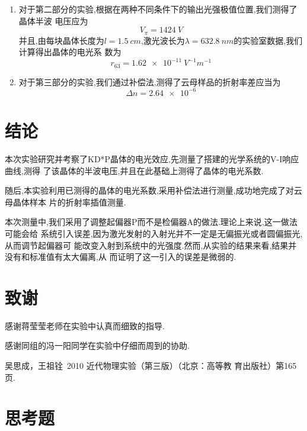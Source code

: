 \documentclass[aps,pre,12pt,preprint,onecolumn,showpacs,showkeys]{revtex4-1}
\begin{document}
\begin{enumerate}
\item
    对于第二部分的实验,根据在两种不同条件下的输出光强极值位置,我们测得了晶体半波
    电压应为
    \begin{equation}
        V_{\pi} = \SI{1424}{V}
    \end{equation}
    并且,由每块晶体长度为$l = \SI{1.5}{cm}$,激光波长为$\lambda = \SI{632.8}{nm}$的实验室数据,我们计算得出晶体的电光系
    数为
    \begin{equation}
        r_{63} = \SI{1.62e-11}{V^{-1}m^{-1}}
    \end{equation}

\item
    对于第三部分的实验,我们通过补偿法,测得了云母样品的折射率差应当为
    \begin{equation}
        \Delta n = \num{2.64e-6}
    \end{equation}

\end{enumerate}

\section{结论}

本次实验研究并考察了KD*P晶体的电光效应,先测量了搭建的光学系统的V-I响应曲线,测得
了该晶体的半波电压,并且在此基础上测得了晶体的电光系数.

随后,本实验利用已测得的晶体的电光系数,采用补偿法进行测量,成功地完成了对云母晶体样本
片的折射率插值测量.

本次测量中,我们采用了调整起偏器P而不是检偏器A的做法.理论上来说,这一做法可能会给
系统引入误差,因为激光发射的入射光并不一定是无偏振光或者圆偏振光,从而调节起偏器可
能改变入射到系统中的光强度.然而,从实验的结果来看,结果并没有和标准值有太大偏离,从
而证明了这一引入的误差是微弱的.


\section{致谢}

感谢蒋莹莹老师在实验中认真而细致的指导.

感谢同组的冯一阳同学在实验中仔细而周到的协助.

\begin{thebibliography}{}
 吴思成，王祖铨~2010 近代物理实验（第三版）（北京：高等教
育出版社）第165页.  %
\end{thebibliography}

\clearpage
\appendix
\section{思考题}
\end{document}

